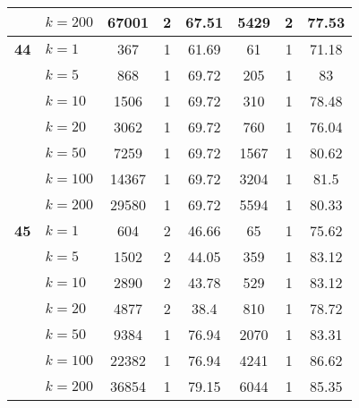 \begin{table}[htbp]
\begin{tabular}{|l|l|c|c|c|c|c|c|}
     & $k=200$ & 67001 & 2 & 67.51 & 5429 & 2 & 77.53 \\ \hline
    \multicolumn{1}{|r|}{\textbf{44}} & $k=1$ & 367 & 1 & 61.69 & 61 & 1 & 71.18 \\ 
     & $k=5$ & 868 & 1 & 69.72 & 205 & 1 & 83 \\ 
     & $k=10$ & 1506 & 1 & 69.72 & 310 & 1 & 78.48 \\ 
     & $k=20$ & 3062 & 1 & 69.72 & 760 & 1 & 76.04 \\ 
     & $k=50$ & 7259 & 1 & 69.72 & 1567 & 1 & 80.62 \\ 
     & $k=100$ & 14367 & 1 & 69.72 & 3204 & 1 & 81.5 \\ 
     & $k=200$ & 29580 & 1 & 69.72 & 5594 & 1 & 80.33 \\ \hline
    \multicolumn{1}{|r|}{\textbf{45}} & $k=1$ & 604 & 2 & 46.66 & 65 & 1 & 75.62 \\ 
     & $k=5$ & 1502 & 2 & 44.05 & 359 & 1 & 83.12 \\ 
     & $k=10$ & 2890 & 2 & 43.78 & 529 & 1 & 83.12 \\ 
     & $k=20$ & 4877 & 2 & 38.4 & 810 & 1 & 78.72 \\ 
     & $k=50$ & 9384 & 1 & 76.94 & 2070 & 1 & 83.31 \\ 
     & $k=100$ & 22382 & 1 & 76.94 & 4241 & 1 & 86.62 \\ 
     & $k=200$ & 36854 & 1 & 79.15 & 6044 & 1 & 85.35 \\ \hline
    \end{tabular}
\end{table}
